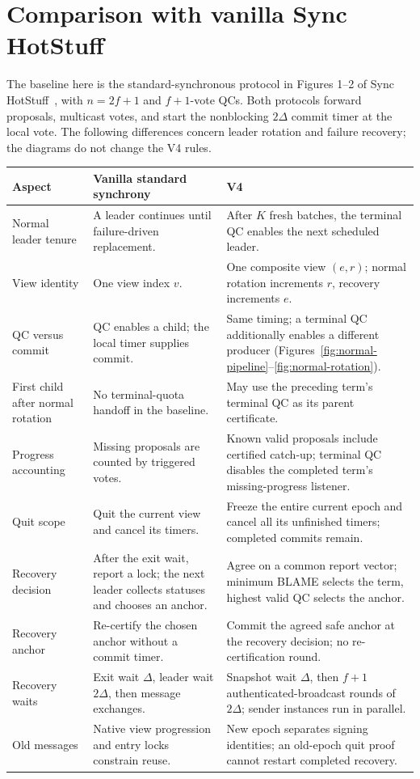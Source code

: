 \documentclass[10pt,a4paper]{article}
\begin{document}
\clearpage
\section*{Comparison with vanilla Sync HotStuff}
The baseline here is the standard-synchronous protocol in Figures 1--2 of
Sync HotStuff~\cite{sync}, with $n=2f+1$ and $f+1$-vote QCs. Both protocols
forward proposals, multicast votes, and start the nonblocking $2\Delta$
commit timer at the local vote. The following differences concern leader
rotation and failure recovery; the diagrams do not change the V4 rules.

\begin{center}\small
\begin{tabularx}{\linewidth}{@{}>{\raggedright\arraybackslash}p{.18\linewidth}>{\raggedright\arraybackslash}p{.32\linewidth}Y@{}}
\toprule
Aspect & Vanilla standard synchrony & V4\\\midrule
Normal leader tenure & A leader continues until failure-driven replacement. &
After $K$ fresh batches, the terminal QC enables the next scheduled leader.\\
View identity & One view index $v$. & One composite view $(e,r)$;
normal rotation increments $r$, recovery increments $e$.\\
QC versus commit & QC enables a child; the local timer supplies commit. &
Same timing; a terminal QC additionally enables a different producer
(Figures~\ref{fig:normal-pipeline}--\ref{fig:normal-rotation}).\\
First child after normal rotation & No terminal-quota handoff in the baseline. &
May use the preceding term's terminal QC as its parent certificate.\\
Progress accounting & Missing proposals are counted by triggered votes. &
Known valid proposals include certified catch-up; terminal QC disables the
completed term's missing-progress listener.\\
Quit scope & Quit the current view and cancel its timers. & Freeze the entire
current epoch and cancel all its unfinished timers; completed commits remain.\\
Recovery decision & After the exit wait, report a lock; the next leader
collects statuses and chooses an anchor. & Agree on a common report vector;
minimum BLAME selects the term, highest valid QC selects the anchor.\\
Recovery anchor & Re-certify the chosen anchor without a commit timer. &
Commit the agreed safe anchor at the recovery decision; no re-certification round.\\
Recovery waits & Exit wait $\Delta$, leader wait $2\Delta$, then message
exchanges. & Snapshot wait $\Delta$, then $f+1$ authenticated-broadcast rounds
of $2\Delta$; sender instances run in parallel.\\
Old messages & Native view progression and entry locks constrain reuse. &
New epoch separates signing identities; an old-epoch quit proof cannot
restart completed recovery.\\\bottomrule
\end{tabularx}\end{center}
\end{document}
